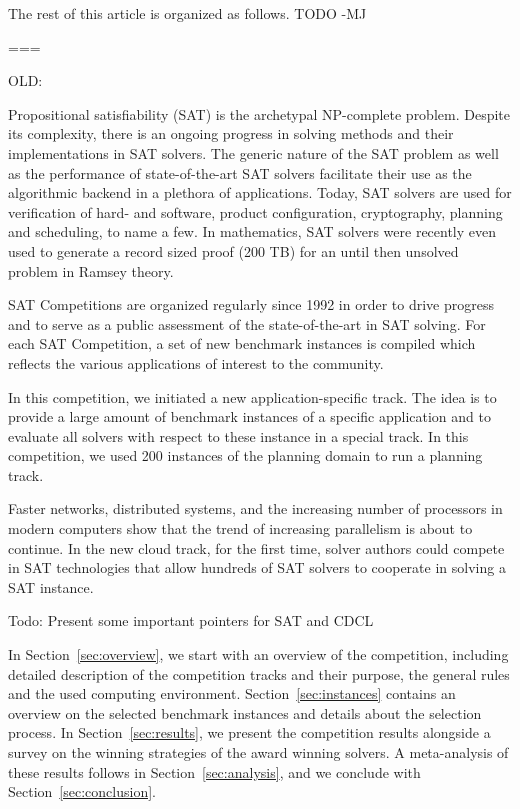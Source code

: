 \documentclass{elsarticle}
\newcommand{\todo}[1]{{\color{purple}Todo: #1}}
\begin{document}
The rest of this article is organized as follows. TODO -MJ

===

OLD:

Propositional satisfiability (SAT) is the archetypal NP-complete problem. 
Despite its complexity, there is an ongoing progress in solving methods and their implementations in SAT solvers. 
The generic nature of the SAT problem as well as the performance of state-of-the-art SAT solvers facilitate their use as the algorithmic backend in a plethora of applications. 
Today, SAT solvers are used for verification of hard- and software, product configuration, cryptography, planning and scheduling, to name a few. 
In mathematics, SAT solvers were recently even used to generate a record sized proof (200 TB) for an until then unsolved problem in Ramsey theory. 

SAT Competitions are organized regularly since 1992 in order to drive progress and to serve as a public assessment of the state-of-the-art in SAT solving. 
For each SAT Competition, a set of new benchmark instances is compiled which reflects the various applications of interest to the community. 

In this competition, we initiated a new application-specific track. 
The idea is to provide a large amount of benchmark instances of a specific application and to evaluate all solvers with respect to these instance in a special track. 
In this competition, we used 200 instances of the planning domain to run a planning track. 

Faster networks, distributed systems, and the increasing number of processors in modern computers show that the trend of increasing parallelism is about to continue.  
In the new cloud track, for the first time, solver authors could compete in SAT technologies that allow hundreds of SAT solvers to cooperate in solving a SAT instance. 

\todo{Present some important pointers for SAT and CDCL}

In Section~\ref{sec:overview}, we start with an overview of the competition,
including detailed description of the competition tracks and their purpose,
the general rules and the used computing environment.
Section~\ref{sec:instances} contains an overview on the selected benchmark instances and details about the selection process. 
In Section~\ref{sec:results}, we present the competition results alongside a survey on the winning strategies of the award winning solvers. 
A meta-analysis of these results follows in Section~\ref{sec:analysis}, and we conclude with Section~\ref{sec:conclusion}.
\end{document}
